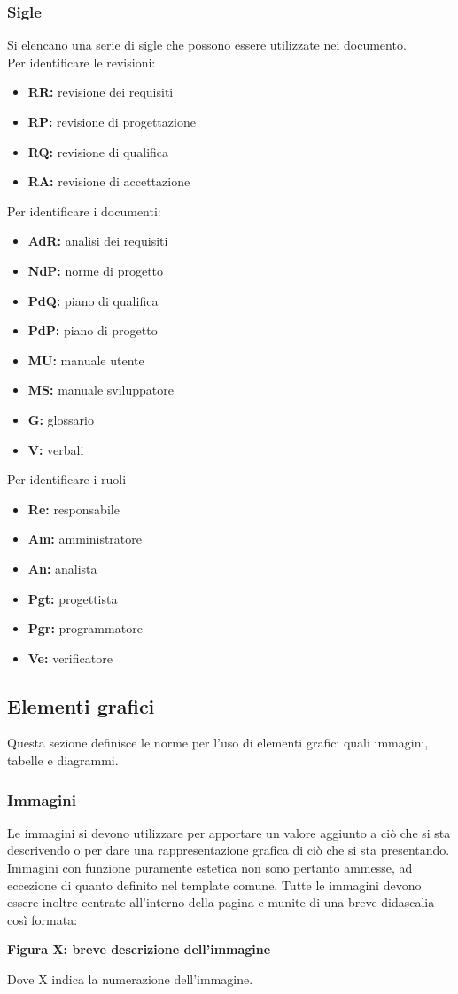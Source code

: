 \subsubsection{Sigle}
Si elencano una serie di sigle che possono essere utilizzate nei documento. 
\\
Per identificare le revisioni:
\begin{itemize}
\item \textbf{RR:} revisione dei requisiti
	\item \textbf{RP:} revisione di progettazione
	 	\item \textbf{RQ:} revisione di qualifica
			\item \textbf{RA:} revisione di accettazione
\end{itemize} 
Per identificare i documenti:
\begin{itemize}
\item \textbf{AdR:} analisi dei requisiti
	\item \textbf{NdP:} norme di progetto
		\item \textbf{PdQ:} piano di qualifica
			\item \textbf{PdP:} piano di progetto
				\item \textbf{MU:} manuale utente
					\item \textbf{MS:} manuale sviluppatore			
						\item \textbf{G:} glossario
							\item \textbf{V:} verbali
\end{itemize}
Per identificare i ruoli
\begin{itemize}
\item \textbf{Re:} responsabile
	\item \textbf{Am:} amministratore
		\item \textbf{An:} analista
			\item \textbf{Pgt:} progettista
				\item \textbf{Pgr:} programmatore
					\item \textbf{Ve:} verificatore
\end{itemize}
\subsection{Elementi grafici}
Questa sezione definisce le norme per l'uso di elementi grafici quali immagini, tabelle e diagrammi.
\subsubsection{Immagini}
Le immagini si devono utilizzare per apportare un valore aggiunto a ciò che si sta descrivendo o per dare una rappresentazione grafica di ciò che si sta presentando. Immagini con funzione puramente estetica non sono pertanto ammesse, ad eccezione di quanto definito nel template comune. Tutte le immagini devono essere inoltre centrate all’interno della pagina e munite di una breve didascalia così formata:
\begin{center}
	\textbf {Figura X: breve descrizione dell'immagine}
\end{center}
Dove X indica la numerazione dell'immagine.
